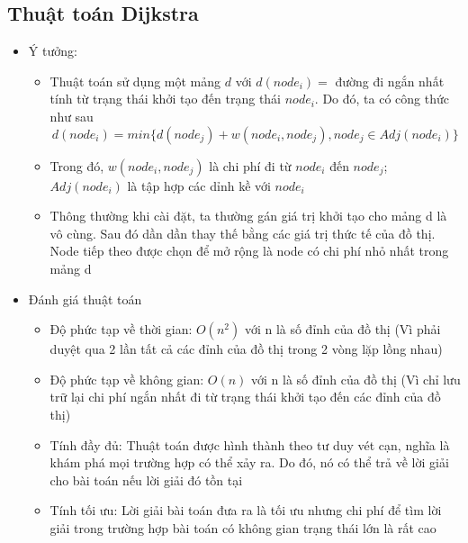 \documentclass[a4paper, 12pt]{article}
\begin{document}
    \subsection{Thuật toán Dijkstra}
    \begin{itemize}
        \item Ý tưởng:
        \begin{itemize}
            \item Thuật toán sử dụng một mảng $d$ với $d(node_i) = $ đường đi ngắn nhất tính từ trạng thái khởi tạo đến trạng thái $node_i$. Do đó, ta có công thức như sau $$d(node_i) = min\{d(node_j) + w(node_i, node_j), node_j \in Adj(node_i) \}$$
            \item Trong đó, $w(node_i, node_j)$ là chi phí đi từ $node_i$ đến $node_j$; $Adj(node_i)$ là tập hợp các dỉnh kề với $node_i$
            \item Thông thường khi cài đặt, ta thường gán giá trị khởi tạo cho mảng d là vô cùng. Sau đó dần dần thay thế bằng các giá trị thức tế của đồ thị. Node tiếp theo được chọn để mở rộng là node có chi phí nhỏ nhất trong mảng d
        \end{itemize}

        \item Đánh giá thuật toán
        \begin{itemize}
            \item Độ phức tạp về thời gian: $O(n^2)$ với n là số đỉnh của đồ thị (Vì phải duyệt qua 2 lần tất cả các đỉnh của đồ thị trong 2 vòng lặp lồng nhau)
            \item Độ phức tạp về không gian: $O(n)$ với n là số đỉnh của đồ thị (Vì chỉ lưu trữ lại chi phí ngắn nhất đi từ trạng thái khởi tạo đến các đỉnh của đồ thị)
            \item Tính đầy đủ: Thuật toán được hình thành theo tư duy vét cạn, nghĩa là khám phá mọi trường hợp có thể xảy ra. Do đó, nó có thể trả về lời giải cho bài toán nếu lời giải đó tồn tại
            \item Tính tối ưu: Lời giải bài toán đưa ra là tối ưu nhưng chi phí để tìm lời giải trong trường hợp bài toán có không gian trạng thái lớn là rất cao
        \end{itemize}
    \end{itemize}
\end{document}

